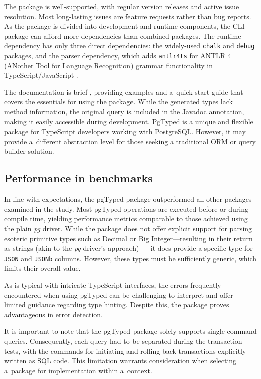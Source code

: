 The package is well-supported, with regular version releases and active issue
resolution. Most long-lasting issues are feature requests rather than bug
reports. As the package is divided into development and runtime components, the
CLI package can afford more dependencies than combined packages. The runtime
dependency has only three direct dependencies: the widely-used \texttt{chalk}
and \texttt{debug} packages, and the parser dependency, which adds
\texttt{antlr4ts} for ANTLR 4 (ANother Tool for Language Recognition) grammar
functionality in TypeScript/JavaScript \cite{pgtyped/runtime}.

The documentation is brief \cite{pgtyped-docs}, providing examples and a~quick
start guide that covers the essentials for using the package. While the
generated types lack method information, the original query is included in the
Javadoc annotation, making it easily accessible during development. PgTyped is a
unique and flexible package for TypeScript developers working with PostgreSQL.
However, it may provide a~different abstraction level for those seeking a
traditional ORM or query builder solution.

\subsection*{Performance in benchmarks}
In line with expectations, the pgTyped package outperformed all other packages
examined in the study. Most pgTyped operations are executed before or during
compile time, yielding performance metrics comparable to those achieved using
the plain \textit{pg} driver. While the package does not offer explicit support for
parsing esoteric primitive types such as Decimal or Big Integer—resulting in
their return as strings (akin to the \textit{pg} driver's approach) — it does provide a
specific type for \texttt{JSON} and \texttt{JSONb} columns. However, these types
must be sufficiently generic, which limits their overall value.

As is typical with intricate TypeScript interfaces, the errors frequently
encountered when using pgTyped can be challenging to interpret and offer
limited guidance regarding type hinting. Despite this, the package proves
advantageous in error detection.

It is important to note that the pgTyped package solely supports
single-command queries. Consequently, each query had to be separated during the
transaction tests, with the commands for initiating and rolling back
transactions explicitly written as SQL code. This limitation warrants
consideration when selecting a~package for implementation within a~context.
